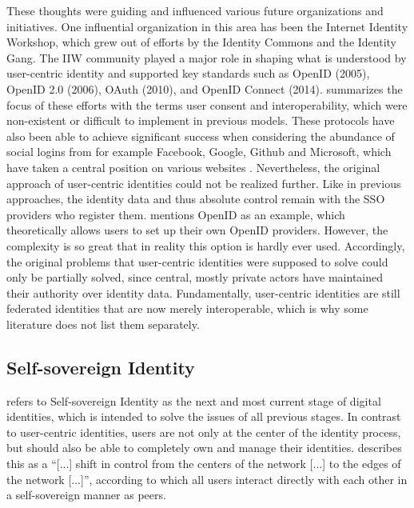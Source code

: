 	    These thoughts were guiding and influenced various future organizations and initiatives. One influential organization in this area has been the Internet Identity Workshop, which grew out of efforts by the Identity Commons and the Identity Gang. The IIW community played a major role in shaping what is understood by user-centric identity and supported key standards such as OpenID (2005), OpenID 2.0 (2006), OAuth (2010), and OpenID Connect (2014). \cite{allen_path_2016} summarizes the focus of these efforts with the terms user consent and interoperability, which were non-existent or difficult to implement in previous models. These protocols have also been able to achieve significant success when considering the abundance of social logins from for example Facebook, Google, Github and Microsoft, which have taken a central position on various websites \cite[p. 8]{preukschat_self-sovereign_2021}. Nevertheless, the original approach of user-centric identities could not be realized further. Like in previous approaches, the identity data and thus absolute control remain with the SSO providers who register them. \cite{allen_path_2016} mentions OpenID as an example, which theoretically allows users to set up their own OpenID providers. However, the complexity is so great that in reality this option is hardly ever used. Accordingly, the original problems that user-centric identities were supposed to solve could only be partially solved, since central, mostly private actors have maintained their authority over identity data. Fundamentally, user-centric identities are still federated identities that are now merely interoperable, which is why some literature \cite{ehrlich_self-sovereign_2021, preukschat_self-sovereign_2021} does not list them separately. \cite{allen_path_2016} 
	    
	    \subsection{Self-sovereign Identity}
	    \cite{allen_path_2016} refers to Self-sovereign Identity as the next and most current stage of digital identities, which is intended to solve the issues of all previous stages. In contrast to user-centric identities, users are not only at the center of the identity process, but should also be able to completely own and manage their identities. \cite[p. 12]{preukschat_self-sovereign_2021} describes this as a “[...] shift in control from the centers of the network [...] to the edges of the network [...]”, according to which all users interact directly with each other in a self-sovereign manner as peers. 
	    

